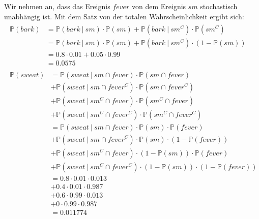 \documentclass[a4paper]{scrartcl}
\newcommand{\prob}{\mathbb{P}}
\begin{document}
Wir nehmen an, dass das Ereignis $fever$ von dem Ereignis $sm$ stochastisch
unabhängig ist.  Mit dem Satz von der totalen Wahrscheinlichkeit ergibt sich:
\begin{align*}
    \begin{split}
        \prob(bark) &= \prob(bark\ |\ sm) \cdot \prob(sm) +
                       \prob(bark\ |\ sm^C) \cdot \prob(sm^C) \\
                    &= \prob(bark\ |\ sm) \cdot \prob(sm) +
                       \prob(bark\ |\ sm^C) \cdot (1 - \prob(sm)) \\
                    &= \num{0,8} \cdot \num{0,01} +
                       \num{0,05} \cdot \num{0,99} \\
                    &= \num{0,0575}
    \end{split} \\
    \begin{split}
        \prob(sweat) &= \prob(sweat\ |\ sm \cap fever) \cdot
                        \prob(sm \cap fever) \\
                     &+ \prob(sweat\ |\ sm \cap fever^C) \cdot
                        \prob(sm \cap fever^C) \\
                     &+ \prob(sweat\ |\ sm^C \cap fever) \cdot
                        \prob(sm^C \cap fever) \\
                     &+ \prob(sweat\ |\ sm^C \cap fever^C) \cdot
                        \prob(sm^C \cap fever^C) \\
                     &= \prob(sweat\ |\ sm \cap fever) \cdot
                        \prob(sm) \cdot \prob(fever) \\
                     &+ \prob(sweat\ |\ sm \cap fever^C) \cdot
                        \prob(sm) \cdot (1 - \prob(fever)) \\
                     &+ \prob(sweat\ |\ sm^C \cap fever) \cdot
                        (1 - \prob(sm)) \cdot \prob(fever) \\
                     &+ \prob(sweat\ |\ sm^C \cap fever^C) \cdot
                        (1 - \prob(sm)) \cdot (1 - \prob(fever)) \\
                        &= \num{0,8} \cdot
                        \num{0,01} \cdot \num{0,013} \\
                        &+ \num{0,4} \cdot
                        \num{0,01} \cdot \num{0,987} \\
                        &+ \num{0,6} \cdot
                        \num{0,99} \cdot \num{0,013} \\
                        &+ \num{0} \cdot
                        \num{0,99} \cdot \num{0,987} \\
                     &= \num{0.011774}
    \end{split}
\end{align*}
\end{document}
